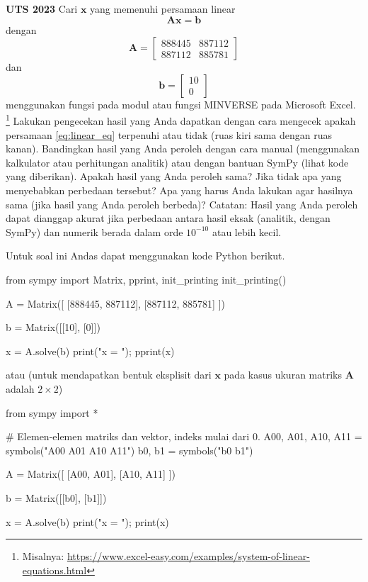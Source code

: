 \begin{soal}
\textbf{UTS 2023}
Cari $\mathbf{x}$ yang memenuhi persamaan linear
\begin{equation}
\mathbf{A} \mathbf{x} = \mathbf{b}
\label{eq:linear_eq}
\end{equation}
dengan
\begin{equation*}
\mathbf{A} = \begin{bmatrix}
888445 & 887112\\
887112 & 885781
\end{bmatrix}
\end{equation*}
dan
\begin{equation*}
\mathbf{b} = \begin{bmatrix}
10\\
0
\end{bmatrix}
\end{equation*}
menggunakan fungsi  pada modul 
atau fungsi MINVERSE pada Microsoft Excel.
\footnote{Misalnya: \url{https://www.excel-easy.com/examples/system-of-linear-equations.html}}
Lakukan pengecekan hasil yang Anda
dapatkan dengan cara mengecek apakah persamaan \ref{eq:linear_eq} terpenuhi atau tidak
(ruas kiri sama dengan ruas kanan).
Bandingkan hasil yang Anda peroleh dengan cara manual (menggunakan kalkulator atau
perhitungan analitik) atau dengan bantuan SymPy (lihat kode yang diberikan).
Apakah hasil yang Anda peroleh sama? Jika tidak apa yang
menyebabkan perbedaan tersebut? Apa yang harus Anda lakukan agar hasilnya sama (jika
hasil yang Anda peroleh berbeda)? Catatan: Hasil yang Anda peroleh dapat dianggap
akurat jika perbedaan antara
hasil eksak (analitik, dengan SymPy) dan numerik berada dalam orde $10^{-10}$ atau lebih
kecil.
\end{soal}
    
Untuk soal ini Andas dapat menggunakan kode Python berikut.
\begin{pythoncode}
from sympy import Matrix, pprint, init_printing
init_printing()
    
A = Matrix([
    [888445, 887112],
    [887112, 885781]
])

b = Matrix([[10], [0]])
    
x = A.solve(b)
print("x = ");
pprint(x)
\end{pythoncode}
atau (untuk mendapatkan bentuk eksplisit dari $\mathbf{x}$ pada kasus
ukuran matriks $\mathbf{A}$ adalah $2\times2$)
\begin{pythoncode}
from sympy import *
    
# Elemen-elemen matriks dan vektor, indeks mulai dari 0.
A00, A01, A10, A11 = symbols("A00 A01 A10 A11")
b0, b1 = symbols("b0 b1")
    
A = Matrix([
    [A00, A01],
    [A10, A11]
])
    
b = Matrix([[b0], [b1]])
    
x = A.solve(b)
print("x = ");
print(x)
\end{pythoncode}


